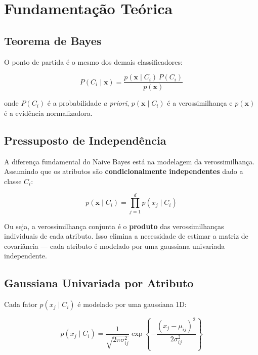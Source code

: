 \documentclass[12pt, a4paper]{article}
\begin{document}
\section{Fundamentação Teórica}

\subsection{Teorema de Bayes}

O ponto de partida é o mesmo dos demais classificadores:

\begin{equation}
    P(C_i \mid \mathbf{x}) =
    \frac{p(\mathbf{x} \mid C_i)\,P(C_i)}{p(\mathbf{x})}
\end{equation}

\noindent onde $P(C_i)$ é a probabilidade \textit{a priori},
$p(\mathbf{x} \mid C_i)$ é a verossimilhança e $p(\mathbf{x})$
é a evidência normalizadora.

\subsection{Pressuposto de Independência}

A diferença fundamental do Naive Bayes está na modelagem da
verossimilhança. Assumindo que os atributos são
\textbf{condicionalmente independentes} dado a classe $C_i$:

\begin{equation}
    p(\mathbf{x} \mid C_i) =
    \prod_{j=1}^{d} p(x_j \mid C_i)
    \label{eq:independencia}
\end{equation}

Ou seja, a verossimilhança conjunta é o \textbf{produto} das
verossimilhanças individuais de cada atributo. Isso elimina a
necessidade de estimar a matriz de covariância — cada atributo é
modelado por uma gaussiana univariada independente.

\subsection{Gaussiana Univariada por Atributo}

Cada fator $p(x_j \mid C_i)$ é modelado por uma gaussiana 1D:

\begin{equation}
    p(x_j \mid C_i) =
    \frac{1}{\sqrt{2\pi\sigma_{ij}^2}}
    \exp\!\left\{
        -\frac{(x_j - \mu_{ij})^2}{2\sigma_{ij}^2}
    \right\}
\end{equation}
\end{document}
